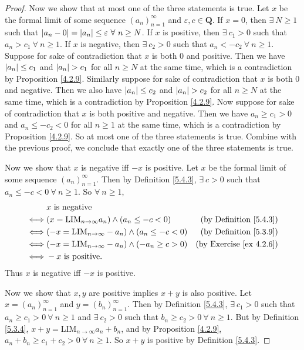 \begin{proof}
Now we show that at most one of the three statements is true.
Let \(x\) be the formal limit of some sequence \((a_n)_{n = 1}^{\infty}\) and \(\varepsilon, c \in \mathbf{Q}\).
If \(x = 0\), then \(\exists\ N \geq 1\) such that \(\abs*{a_n - 0} = \abs*{a_n} \leq \varepsilon \ \forall\ n \geq N\).
If \(x\) is positive, then \(\exists\ c_1 > 0\) such that \(a_n > c_1 \ \forall\ n \geq 1\).
If \(x\) is negative, then \(\exists\ c_2 > 0\) such that \(a_n < -c_2 \ \forall\ n \geq 1\).
Suppose for sake of contradiction that \(x\) is both \(0\) and positive.
Then we have \(\abs*{a_n} \leq c_1\) and \(\abs*{a_n} > c_1\) for all \(n \geq N\) at the same time, which is a contradiction by Proposition \ref{4.2.9}.
Similarly suppose for sake of contradiction that \(x\) is both \(0\) and negative.
Then we also have \(\abs*{a_n} \leq c_2\) and \(\abs*{a_n} > c_2\) for all \(n \geq N\) at the same time, which is a contradiction by Proposition \ref{4.2.9}.
Now suppose for sake of contradiction that \(x\) is both positive and negative.
Then we have \(a_n \geq c_1 > 0\) and \(a_n \leq -c_2 < 0\) for all \(n \geq 1\) at the same time, which is a contradiction by Proposition \ref{4.2.9}.
So at most one of the three statements is true.
Combine with the previous proof, we conclude that exactly one of the three statements is true.

Now we show that \(x\) is negative iff \(-x\) is positive.
Let \(x\) be the formal limit of some sequence \((a_n)_{n = 1}^{\infty}\).
Then by Definition \ref{5.4.3}, \(\exists\ c > 0\) such that \(a_n \leq -c < 0 \ \forall\ n \geq 1\).
So \(\forall\ n \geq 1\),
\begin{align*}
& x \text{ is negative} \\
\iff & (x = \text{LIM}_{n \to \infty} a_n) \land (a_n \leq -c < 0) & \text{(by Definition \ref{5.4.3})} \\
\iff & (-x = \text{LIM}_{n \to \infty} -a_n) \land (a_n \leq -c < 0) & \text{(by Definition \ref{5.3.9})} \\
\iff & (-x = \text{LIM}_{n \to \infty} -a_n) \land (-a_n \geq c > 0) & \text{(by Exercise \ref{ex 4.2.6})} \\
\iff & -x \text{ is positive}.
\end{align*}
Thus \(x\) is negative iff \(-x\) is positive.

Now we show that \(x, y\) are positive implies \(x + y\) is also positive.
Let \(x = (a_n)_{n = 1}^{\infty}\) and \(y = (b_n)_{n = 1}^{\infty}\).
Then by Definition \ref{5.4.3}, \(\exists\ c_1 > 0\) such that \(a_n \geq c_1 > 0 \ \forall\ n \geq 1\) and \(\exists\ c_2 > 0\) such that \(b_n \geq c_2 > 0 \ \forall\ n \geq 1\).
But by Definition \ref{5.3.4}, \(x + y = \text{LIM}_{n \to \infty} a_n + b_n\), and by Proposition \ref{4.2.9}, \(a_n + b_n \geq c_1 + c_2 > 0 \ \forall\ n \geq 1\).
So \(x + y\) is positive by Definition \ref{5.4.3}.


\end{proof}
